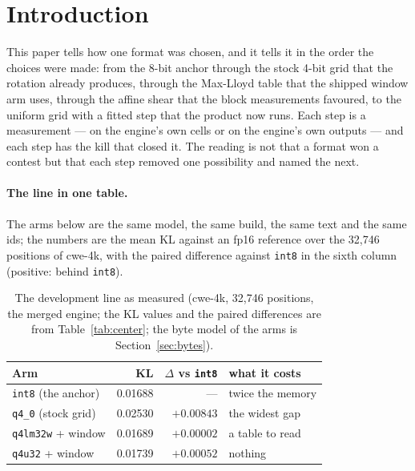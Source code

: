 \documentclass[10pt,twocolumn]{article}
\begin{document}
\section{Introduction}

This paper tells how one format was chosen, and it tells it in the order the choices were made: from the
8-bit anchor through the stock 4-bit grid that the rotation already produces, through the Max-Lloyd table
that the shipped window arm uses, through the affine shear that the block measurements favoured, to the
uniform grid with a fitted step that the product now runs. Each step is a measurement --- on the engine's
own cells or on the engine's own outputs --- and each step has the kill that closed it. The reading is not
that a format won a contest but that each step removed one possibility and named the next.

\paragraph{The line in one table.} The arms below are the same model, the same build, the same text and the
same ids; the numbers are the mean KL against an fp16 reference over the 32,746 positions of cwe-4k, with
the paired difference against \texttt{int8} in the sixth column (positive: behind \texttt{int8}).

\begin{table}[t]
\centering
\footnotesize
\caption{The development line as measured (cwe-4k, 32,746 positions, the merged engine; the KL values and
the paired differences are from Table~\ref{tab:center}; the byte model of the arms is Section~\ref{sec:bytes}).}
\label{tab:line}
\begin{tabular}{@{}lrrl@{}}
\toprule
Arm & KL & $\Delta$ vs \texttt{int8} & what it costs \\
\midrule
\texttt{int8} (the anchor)   & 0.01688 & ---         & twice the memory \\
\texttt{q4\_0} (stock grid) & 0.02530 & $+0.00843$ & the widest gap \\
\texttt{q4lm32w} + window   & 0.01689 & $+0.00002$ & a table to read \\
\texttt{q4u32} + window     & 0.01739 & $+0.00052$ & nothing \\
\bottomrule
\end{tabular}
\end{table}
\end{document}
